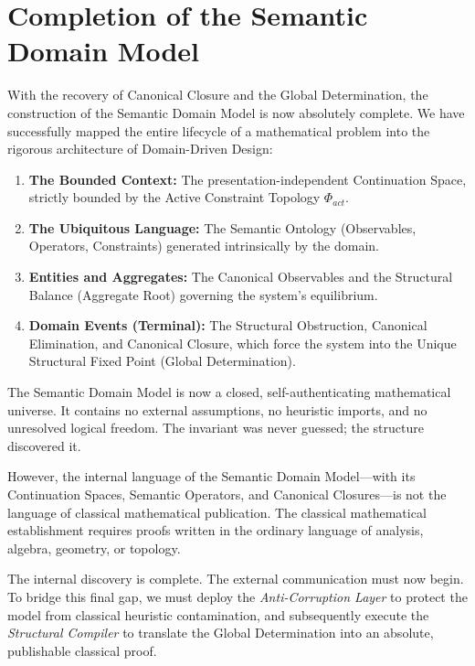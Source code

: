 \documentclass[12pt,openany]{extbook}
\theoremstyle{plain}
\theoremstyle{definition}
\begin{document}
\section{Completion of the Semantic Domain Model}

With the recovery of Canonical Closure and the Global Determination, the construction of the Semantic Domain Model is now absolutely complete. We have successfully mapped the entire lifecycle of a mathematical problem into the rigorous architecture of Domain-Driven Design:

\begin{enumerate}
    \item \textbf{The Bounded Context:} The presentation-independent Continuation Space, strictly bounded by the Active Constraint Topology $\Phi_{act}$.
    \item \textbf{The Ubiquitous Language:} The Semantic Ontology (Observables, Operators, Constraints) generated intrinsically by the domain.
    \item \textbf{Entities and Aggregates:} The Canonical Observables and the Structural Balance (Aggregate Root) governing the system's equilibrium.
    \item \textbf{Domain Events (Terminal):} The Structural Obstruction, Canonical Elimination, and Canonical Closure, which force the system into the Unique Structural Fixed Point (Global Determination).
\end{enumerate}

The Semantic Domain Model is now a closed, self-authenticating mathematical universe. It contains no external assumptions, no heuristic imports, and no unresolved logical freedom. The invariant was never guessed; the structure discovered it.

However, the internal language of the Semantic Domain Model---with its Continuation Spaces, Semantic Operators, and Canonical Closures---is not the language of classical mathematical publication. The classical mathematical establishment requires proofs written in the ordinary language of analysis, algebra, geometry, or topology. 

The internal discovery is complete. The external communication must now begin. To bridge this final gap, we must deploy the \emph{Anti-Corruption Layer} to protect the model from classical heuristic contamination, and subsequently execute the \emph{Structural Compiler} to translate the Global Determination into an absolute, publishable classical proof.

\end{document}
